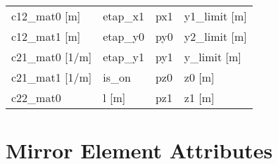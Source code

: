 \begin{tabular}{llll}
c12_mat0 [m]                     & etap_x1                          & px1                              & y1_limit [m]                     \\
c12_mat1 [m]                     & etap_y0                          & py0                              & y2_limit [m]                     \\
c21_mat0 [1/m]                   & etap_y1                          & py1                              & y_limit [m]                      \\
c21_mat1 [1/m]                   & is_on                            & pz0                              & z0 [m]                           \\
c22_mat0                         & l [m]                            & pz1                              & z1 [m]                           \\
 \bottomrule
 \end{tabular}
 \vfill
 
 \section{Mirror Element Attributes}
 \label{s:list.mirror}
 
